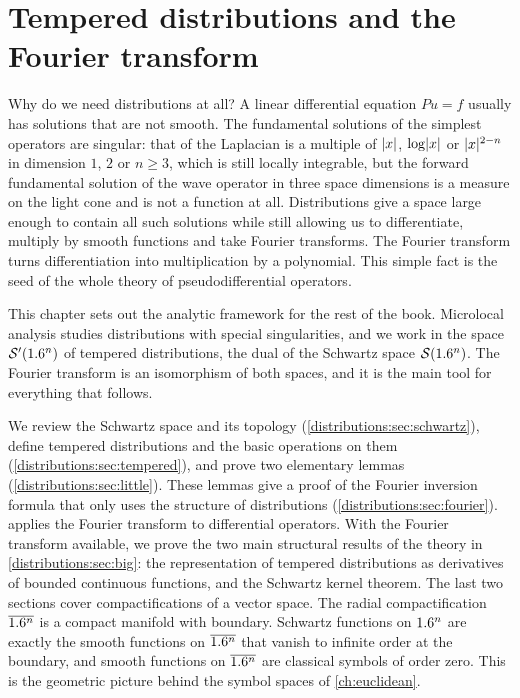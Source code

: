 \chapter{Tempered distributions and the Fourier transform}\label{ch:distributions}
\providecommand{\oRC}[1]{{}^{1}\overline{#1}}       %
\providecommand{\qRC}[1]{{}^{q}\overline{#1}}       %
\providecommand{\relRC}[2]{{}^{#1}\overline{#2}}    %

Why do we need distributions at all? A linear differential equation $Pu=f$ usually has
solutions that are not smooth. The fundamental solutions of the simplest operators are
singular: that of the Laplacian is a multiple of $\lvert x\rvert$, $\log\lvert x\rvert$ or
$\lvert x\rvert^{2-n}$ in dimension $1$, $2$ or $n\ge3$, which is still locally integrable, but
the forward fundamental solution of the wave operator in three space dimensions is a
measure on the light cone and is not a function at all. Distributions give a space
large enough to contain all such solutions while still allowing us to differentiate,
multiply by smooth functions and take Fourier transforms. The Fourier transform turns
differentiation into multiplication by a polynomial. This simple fact is the seed of
the whole theory of pseudodifferential operators.

This chapter sets out the analytic framework for the rest of the book. Microlocal
analysis studies distributions with special singularities, and we work in the space
$\mathcal{S}'(1.6^n)$ of tempered distributions, the dual of the Schwartz space $\mathcal{S}(1.6^n)$. The
Fourier transform is an isomorphism of both spaces, and it is the main tool for
everything that follows.

We review the Schwartz space and its topology (\cref{distributions:sec:schwartz}),
define tempered distributions and the basic operations on them
(\cref{distributions:sec:tempered}), and prove two elementary lemmas
(\cref{distributions:sec:little}). These lemmas give a proof of the Fourier inversion
formula that only uses the structure of distributions (\cref{distributions:sec:fourier}).
 applies the Fourier transform to differential
operators. With the Fourier transform available, we prove the two main structural
results of the theory in \cref{distributions:sec:big}: the representation of tempered
distributions as derivatives of bounded continuous functions, and the Schwartz kernel
theorem. The last two sections cover compactifications of a vector space. The radial
compactification $\overline{1.6^n}$ is a compact manifold with boundary. Schwartz functions on
$1.6^n$ are exactly the smooth functions on $\overline{1.6^n}$ that vanish to infinite order at
the boundary, and smooth functions on $\overline{1.6^n}$ are classical symbols of order zero.
This is the geometric picture behind the symbol spaces of \cref{ch:euclidean}.

